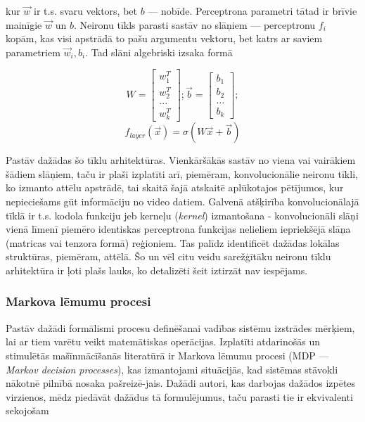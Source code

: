\documentclass[12pt, a4paper]{article}
\numberwithin{equation}{section} %
\begin{document}
kur $\vec{w}$ ir t.s. svaru vektors, bet $b$ ---  nobīde. Perceptrona parametri tātad ir brīvie mainīgie $\vec{w}$ un $b$. Neironu tīkls parasti sastāv no slāņiem --- perceptronu $f_i$ kopām, kas visi apstrādā to pašu argumentu vektoru, bet katrs ar saviem parametriem $\vec{w}_i,b_i$. Tad slāni algebriski izsaka formā

\begin{equation} 
    W = \begin{bmatrix}
        w_1^T \\
        w_2^T \\
        ... \\
        w_k^T
    \end{bmatrix}; 
    \vec{b} =  \begin{bmatrix}
        b_1 \\
        b_2 \\
        ... \\
        b_k
    \end{bmatrix}; 
\end{equation}
\begin{equation} 
    f_{layer}(\vec{x}) = \sigma(W\vec{x}+\vec{b})
\end{equation}

Pastāv dažādas šo tīklu arhitektūras. Vienkāršākās sastāv no viena vai vairākiem šādiem slāņiem, taču ir plaši izplatīti arī, piemēram, konvolucionālie neironu tīkli\cite{krizhevsky2012imagenet}, ko izmanto attēlu apstrādē, tai skaitā šajā atskaitē aplūkotajos pētījumos, kur nepieciešams gūt informāciju no video datiem. Galvenā atšķirība konvolucionālajā tīklā ir t.s. kodola funkciju jeb kerneļu (\textit{kernel}) izmantošana - konvolucionāli slāņi vienā līmenī piemēro identiskas perceptrona funkcijas nelieliem iepriekšējā slāņa (matricas vai tenzora formā) reģioniem. Tas palīdz identificēt dažādas lokālas struktūras, piemēram, attēlā. Šo un vēl citu veidu sarežģītāku neironu tīklu arhitektūra ir ļoti plašs lauks, ko detalizēti šeit iztirzāt nav iespējams.

\subsubsection{Markova lēmumu procesi}

Pastāv dažādi formālismi procesu definēšanai vadības sistēmu izstrādes mērķiem, lai ar tiem varētu veikt matemātiskas operācijas. Izplatīti atdarinošās un stimulētās mašīnmācīšanās literatūrā ir Markova lēmumu procesi (MDP --- \textit{Markov decision processes}), kas izmantojami situācijās, kad sistēmas stāvokli nākotnē pilnībā nosaka pašreizē-jais. Dažādi autori, kas darbojas dažādos izpētes virzienos, mēdz piedāvāt dažādus tā formulējumus, taču parasti tie ir ekvivalenti sekojošam\cite{attia2018global}
\end{document}
